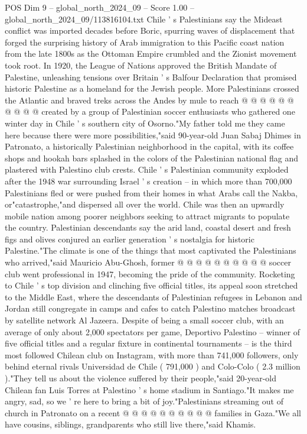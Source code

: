 \begin{textsample}{POS Dim 9 – global\_north\_2024\_09 – Score 1.00 – global\_north\_2024\_09/113816104.txt}
Chile ' s Palestinians say the Mideast conflict was imported decades before Boric, spurring waves of displacement that forged the surprising history of Arab immigration to this Pacific coast nation from the late 1800s as the Ottoman Empire crumbled and the Zionist movement took root.
In 1920, the League of Nations approved the British Mandate of Palestine, unleashing tensions over Britain ' s Balfour Declaration that promised historic Palestine as a homeland for the Jewish people.
More Palestinians crossed the Atlantic and braved treks across the Andes by mule to reach @ @ @ @ @ @ @ @ @ @ created by a group of Palestinian soccer enthusiasts who gathered one winter day in Chile ' s southern city of Osorno."My father told me they came here because there were more possibilities,"said 90-year-old Juan Sabaj Dhimes in Patronato, a historically Palestinian neighborhood in the capital, with its coffee shops and hookah bars splashed in the colors of the Palestinian national flag and plastered with Palestino club crests.
Chile ' s Palestinian community exploded after the 1948 war surrounding Israel ' s creation -- in which more than 700,000 Palestinians fled or were pushed from their homes in what Arabs call the Nakba, or"catastrophe,"and dispersed all over the world.
Chile was then an upwardly mobile nation among poorer neighbors seeking to attract migrants to populate the country.
Palestinian descendants say the arid land, coastal desert and fresh figs and olives conjured an earlier generation ' s nostalgia for historic Palestine."The climate is one of the things that most captivated the Palestinians who arrived,"said Mauricio Abu-Ghosh, former @ @ @ @ @ @ @ @ @ @ soccer club went professional in 1947, becoming the pride of the community.
Rocketing to Chile ' s top division and clinching five official titles, its appeal soon stretched to the Middle East, where the descendants of Palestinian refugees in Lebanon and Jordan still congregate in camps and cafes to catch Palestino matches broadcast by satellite network Al Jazeera.
Despite of being a small soccer club, with an average of only about 2,000 spectators per game, Deportivo Palestino -- winner of five official titles and a regular fixture in continental tournaments -- is the third most followed Chilean club on Instagram, with more than 741,000 followers, only behind eternal rivals Universidad de Chile ( 791,000 ) and Colo-Colo ( 2.3 million )."They tell us about the violence suffered by their people,"said 20-year-old Chilean fan Luis Torres at Palestino ' s home stadium in Santiago."It makes me angry, sad, so we ' re here to bring a bit of joy."Palestinians streaming out of church in Patronato on a recent @ @ @ @ @ @ @ @ @ @ families in Gaza."We all have cousins, siblings, grandparents who still live there,"said Khamis.

\end{textsample}

